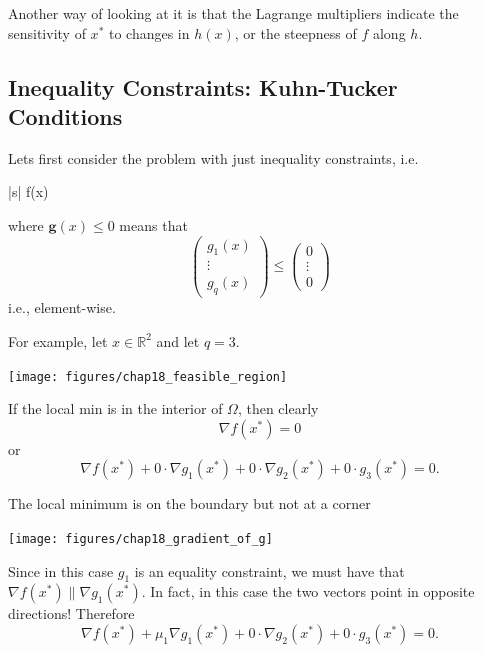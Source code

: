 \documentclass{article}
\newcommand{\gbf}{\mathbf{g}}
\begin{document}
	Another way of looking at it is that the Lagrange multipliers indicate the sensitivity of $x^{\ast}$ to changes in $h(x)$, or the steepness of $f$ along $h$.

	
\subsection{Inequality Constraints: Kuhn-Tucker Conditions}

			Lets first consider the problem with just inequality constraints, i.e.
			\begin{mini*}|s|
				{}{f(x)}{}{}
				\addConstraint{\gbf(x) \leq 0}
			\end{mini*}
			where $\gbf(x) \leq 0$ means that
			\[
				\begin{pmatrix}
			    	g_1(x)\\
			    	\vdots\\
			    	g_q(x)
			  	\end{pmatrix} 
			  	\leq \begin{pmatrix} 
		 				0 \\ \vdots \\ 0
					 \end{pmatrix}
			\]
			i.e., element-wise.			

			For example, let $x \in \mathbb{R}^2$ and let $q = 3$.
			\begin{center}
				\texttt{[image: figures/chap18\_feasible\_region]}
			\end{center}			

\par{}
	If the local min is in the interior of $\Omega$, then clearly
	\[ 
		\nabla f(x^{\ast}) = 0 
	\]
	or
	\[ 
		\nabla f(x^{\ast}) 
			+ 0 \cdot \nabla g_1(x^{\ast}) 
			+ 0 \cdot \nabla g_2(x^{\ast}) 
			+ 0 \cdot g_3(x^{\ast}) = 0.
	\]

\par{}
	The local minimum is on the boundary but not at a corner
	\begin{center}
		\texttt{[image: figures/chap18\_gradient\_of\_g]}
	\end{center}
	Since in this case $g_1$  is an equality constraint, we must have that $\nabla f(x^{\ast}) \parallel \nabla g_1(x^{\ast})$.  In fact, in this case the two vectors point in opposite directions!  Therefore
	\[
		\nabla f(x^{\ast}) + \mu_1 \nabla g_1(x^{\ast}) + 0\cdot \nabla g_2(x^{\ast}) + 0\cdot g_3 (x^{\ast}) = 0.
	\]	
\end{document}
